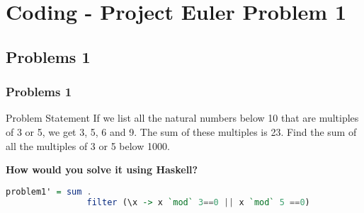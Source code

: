 \section{Coding - Project Euler Problem 1}
\frame{\sectionpage}

\subsection{Problems 1}
	
\begin{frame}[fragile]\frametitle{Problems 1}


\begin{block}{Problem Statement}
			If we list all the natural numbers below 10 that are multiples of
			 3 or 5, we get 3, 5, 6 and 9. The sum of these multiples is 23.
			Find the sum of all the multiples of 3 or 5 below 1000.
\end{block}	
\pause
{\centering
\textbf{How would you solve it using Haskell?}}\pause
	 \begin{lstlisting}[language=Haskell,basicstyle=\footnotesize\ttfamily]
	problem1' = sum . 
	            filter (\x -> x `mod` 3==0 || x `mod` 5 ==0)
	\end{lstlisting}
\end{frame}